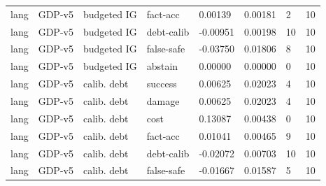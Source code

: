 \documentclass{article}
\begin{document}
\begin{center}
\begin{longtable}{llllllll}
lang & GDP-v5 & budgeted IG & fact-acc & 0.00139 & 0.00181 & 2 & 10 \\
lang & GDP-v5 & budgeted IG & debt-calib & -0.00951 & 0.00198 & 10 & 10 \\
lang & GDP-v5 & budgeted IG & false-safe & -0.03750 & 0.01806 & 8 & 10 \\
lang & GDP-v5 & budgeted IG & abstain & 0.00000 & 0.00000 & 0 & 10 \\
lang & GDP-v5 & calib. debt & success & 0.00625 & 0.02023 & 4 & 10 \\
lang & GDP-v5 & calib. debt & damage & 0.00625 & 0.02023 & 4 & 10 \\
lang & GDP-v5 & calib. debt & cost & 0.13087 & 0.00438 & 0 & 10 \\
lang & GDP-v5 & calib. debt & fact-acc & 0.01041 & 0.00465 & 9 & 10 \\
lang & GDP-v5 & calib. debt & debt-calib & -0.02072 & 0.00703 & 10 & 10 \\
lang & GDP-v5 & calib. debt & false-safe & -0.01667 & 0.01587 & 5 & 10 \\
\bottomrule
\end{longtable}
\renewcommand{\arraystretch}{1.0}
\end{center}
\end{document}
